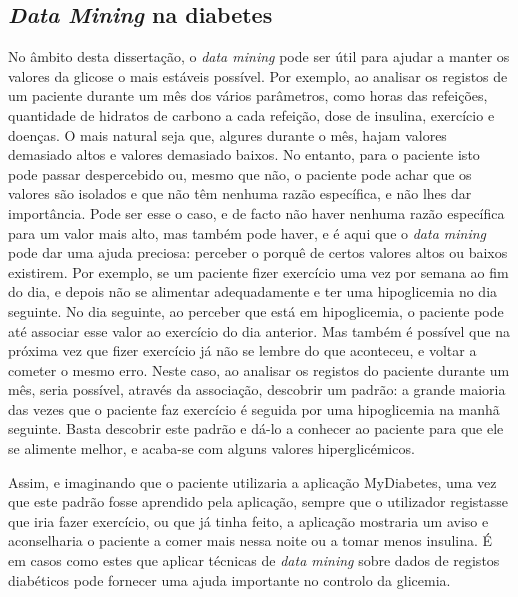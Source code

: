 \subsection{\textit{Data Mining} na diabetes}

No âmbito desta dissertação, o \textit{data mining} pode ser útil para ajudar a manter os valores da glicose o mais estáveis possível. Por exemplo, ao analisar os registos de um paciente durante um mês dos vários parâmetros, como horas das refeições, quantidade de hidratos de carbono a cada refeição, dose de insulina, exercício e doenças. O mais natural seja que, algures durante o mês, hajam valores demasiado altos e valores demasiado baixos. 
No entanto, para o paciente isto pode passar despercebido ou, mesmo que não, o paciente pode achar que os valores são isolados e que não têm nenhuma razão específica, e não lhes dar importância. Pode ser esse o caso, e de facto não haver nenhuma razão específica para um valor mais alto, mas também pode haver, e é aqui que o \textit{data mining} pode dar uma ajuda preciosa:  perceber o porquê de certos valores altos ou baixos existirem. Por exemplo, se um paciente fizer exercício uma vez por semana ao fim do dia, e depois não se alimentar adequadamente e ter uma hipoglicemia no dia seguinte. No dia seguinte, ao perceber que está em hipoglicemia, o paciente pode até associar esse valor ao exercício do dia anterior. Mas também é possível que na próxima vez que fizer exercício já não se lembre do que aconteceu, e voltar a cometer o mesmo erro. 
Neste caso, ao analisar os registos do paciente durante um mês, seria possível, através da associação, descobrir um padrão: a grande maioria das vezes que o paciente faz exercício é seguida por uma hipoglicemia na manhã seguinte. Basta descobrir este padrão e dá-lo a conhecer ao paciente para que ele se alimente melhor, e acaba-se com alguns valores hiperglicémicos. 

Assim, e imaginando que o paciente utilizaria a aplicação MyDiabetes, uma vez que este padrão fosse aprendido pela aplicação, sempre que o utilizador registasse que iria fazer exercício, ou que já tinha feito, a aplicação mostraria um aviso e aconselharia o paciente a comer mais nessa noite ou a tomar menos insulina. É em casos como estes que aplicar técnicas de \textit{data mining} sobre dados de registos diabéticos pode fornecer uma ajuda importante no controlo da glicemia.

